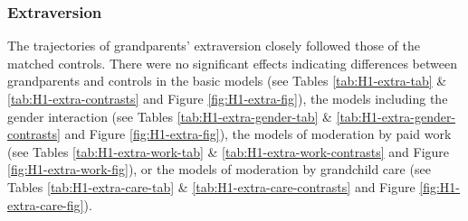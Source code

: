 \documentclass[
  english,
  man, noextraspace,floatsintext]{apa7}
\begin{document}
\hypertarget{extraversion}{%
\subsubsection{Extraversion}\label{extraversion}}

The trajectories of grandparents' extraversion closely followed those of the matched controls. There were no significant effects indicating differences between grandparents and controls in the basic models (see Tables \ref{tab:H1-extra-tab} \& \ref{tab:H1-extra-contrasts} and Figure \ref{fig:H1-extra-fig}), the models including the gender interaction (see Tables \ref{tab:H1-extra-gender-tab} \& \ref{tab:H1-extra-gender-contrasts} and Figure \ref{fig:H1-extra-fig}), the models of moderation by paid work (see Tables \ref{tab:H1-extra-work-tab} \& \ref{tab:H1-extra-work-contrasts} and Figure \ref{fig:H1-extra-work-fig}), or the models of moderation by grandchild care (see Tables \ref{tab:H1-extra-care-tab} \& \ref{tab:H1-extra-care-contrasts} and Figure \ref{fig:H1-extra-care-fig}).
\end{document}
